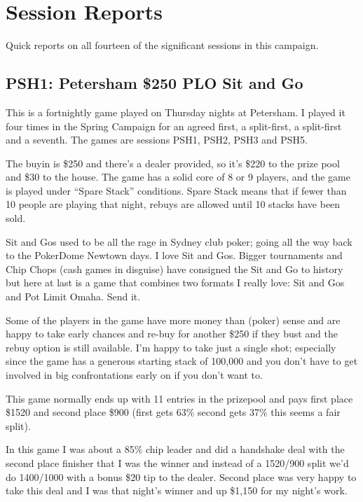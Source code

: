 \chapter{Session Reports}

Quick reports on all fourteen of the significant sessions in this
campaign.

\section*{PSH1: Petersham \$250 PLO Sit and Go}

This is a fortnightly game played on Thursday nights at Petersham.
I played it four times in the Spring Campaign for an agreed first,
a split-first, a split-first and a seventh. The games are sessions
PSH1, PSH2, PSH3 and PSH5.

The buyin is \$250 and there's a dealer provided, so it's \$220 to
the prize pool and \$30 to the house. The game has a solid core of
8 or 9 players, and the game is played under ``Spare Stack''
conditions. Spare Stack means that if fewer than 10 people are playing
that night, rebuys are allowed until 10 stacks have been sold.

Sit and Gos used to be all the rage in Sydney club poker; going all
the way back to the PokerDome Newtown days. I love Sit and Gos.
Bigger tournaments and Chip Chops (cash games in disguise) have
consigned the Sit and Go to history but here at last is a game that
combines two formats I really love: Sit and Gos and Pot Limit
Omaha. Send it.

Some of the players in the game have more money than (poker) sense and
are happy to take early chances and re-buy for another \$250 if they
bust and the rebuy option is still available. I'm happy to take just a
single shot; especially since the game has a generous starting stack
of 100,000 and you don't have to get involved in big confrontations
early on if you don't want to.

This game normally ends up with 11 entries in the prizepool and pays
first place \$1520 and second place \$900 (first gets 63\% second gets
37\% this seems a fair split).

In this game I was about a 85\% chip leader and did a handshake deal
with the second place finisher that I was the winner and instead of a
1520/900 split we'd do 1400/1000 with a bonus \$20 tip to the
dealer. Second place was very happy to take this deal and I was that
night's winner and up \$1,150 for my night's work.

